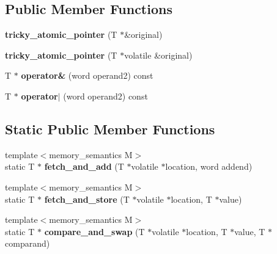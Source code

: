 \subsection*{Public Member Functions}
\begin{DoxyCompactItemize}
\item 
\hypertarget{classtbb_1_1tricky__atomic__pointer_a71d66403286461c2d68efc3ff5324b54}{}{\bfseries tricky\+\_\+atomic\+\_\+pointer} (T $\ast$\&original)\label{classtbb_1_1tricky__atomic__pointer_a71d66403286461c2d68efc3ff5324b54}

\item 
\hypertarget{classtbb_1_1tricky__atomic__pointer_a01c760925390e00865e82bedc5d27987}{}{\bfseries tricky\+\_\+atomic\+\_\+pointer} (T $\ast$volatile \&original)\label{classtbb_1_1tricky__atomic__pointer_a01c760925390e00865e82bedc5d27987}

\item 
\hypertarget{classtbb_1_1tricky__atomic__pointer_a5e497855a2ae4be11bbb13e458872ba0}{}T $\ast$ {\bfseries operator\&} (word operand2) const \label{classtbb_1_1tricky__atomic__pointer_a5e497855a2ae4be11bbb13e458872ba0}

\item 
\hypertarget{classtbb_1_1tricky__atomic__pointer_ae4df942c19349b56750c66a9769ebaea}{}T $\ast$ {\bfseries operator$\vert$} (word operand2) const \label{classtbb_1_1tricky__atomic__pointer_ae4df942c19349b56750c66a9769ebaea}

\end{DoxyCompactItemize}
\subsection*{Static Public Member Functions}
\begin{DoxyCompactItemize}
\item 
\hypertarget{classtbb_1_1tricky__atomic__pointer_a57727fd4dbf1e33b2c7d15e88adf8a61}{}{\footnotesize template$<$memory\+\_\+semantics M$>$ }\\static T $\ast$ {\bfseries fetch\+\_\+and\+\_\+add} (T $\ast$volatile $\ast$location, word addend)\label{classtbb_1_1tricky__atomic__pointer_a57727fd4dbf1e33b2c7d15e88adf8a61}

\item 
\hypertarget{classtbb_1_1tricky__atomic__pointer_ab39ada13c6a2eb3bd4014ec0266c99a3}{}{\footnotesize template$<$memory\+\_\+semantics M$>$ }\\static T $\ast$ {\bfseries fetch\+\_\+and\+\_\+store} (T $\ast$volatile $\ast$location, T $\ast$value)\label{classtbb_1_1tricky__atomic__pointer_ab39ada13c6a2eb3bd4014ec0266c99a3}

\item 
\hypertarget{classtbb_1_1tricky__atomic__pointer_a08cb65e9a5d172d9e596915d59d3d016}{}{\footnotesize template$<$memory\+\_\+semantics M$>$ }\\static T $\ast$ {\bfseries compare\+\_\+and\+\_\+swap} (T $\ast$volatile $\ast$location, T $\ast$value, T $\ast$comparand)\label{classtbb_1_1tricky__atomic__pointer_a08cb65e9a5d172d9e596915d59d3d016}

\end{DoxyCompactItemize}
